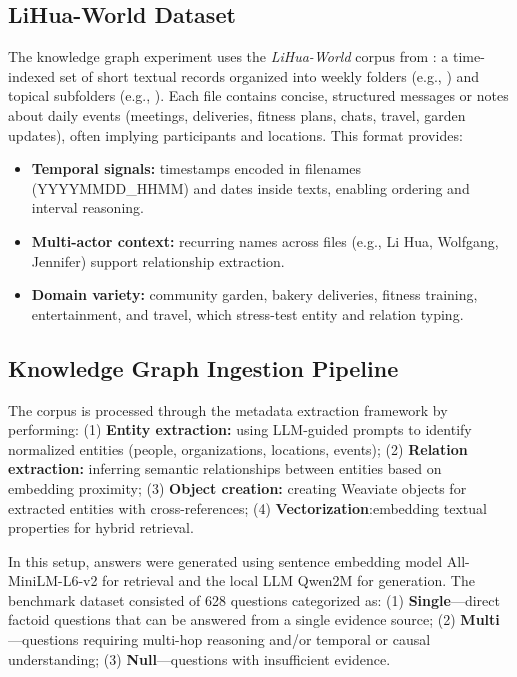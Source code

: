 \subsection{LiHua-World Dataset}
\label{subsec:LiHua-World}
The knowledge graph experiment uses the \emph{LiHua-World} corpus from \cite{fan2025minirag}: a time-indexed set of short textual records organized into weekly folders (e.g., ) and topical subfolders (e.g., ). Each file contains concise, structured messages or notes about daily events (meetings, deliveries, fitness plans, chats, travel, garden updates), often implying participants and locations. This format provides:
\begin{itemize}
    \item \textbf{Temporal signals:} timestamps encoded in filenames (YYYYMMDD\_HHMM) and dates inside texts, enabling ordering and interval reasoning.
    \item \textbf{Multi-actor context:} recurring names across files (e.g., Li Hua, Wolfgang, Jennifer) support relationship extraction.
    \item \textbf{Domain variety:} community garden, bakery deliveries, fitness training, entertainment, and travel, which stress-test entity and relation typing.
\end{itemize}

\subsection{Knowledge Graph Ingestion Pipeline}

The corpus is processed through the metadata extraction framework by performing: (1) \textbf{Entity extraction:} using LLM-guided prompts to identify normalized entities (people, organizations, locations, events); (2) \textbf{Relation extraction:} inferring semantic relationships between entities based on embedding proximity; (3) \textbf{Object creation:} creating  Weaviate objects for extracted entities with cross-references; (4) \textbf{Vectorization}:embedding textual properties for hybrid retrieval.


In this setup, answers were generated using sentence embedding model All-MiniLM-L6-v2 for retrieval and the local LLM Qwen2M for generation. The benchmark dataset consisted of 628 questions categorized as: (1) \textbf{Single}—direct factoid questions that can be answered from a single evidence source; (2) \textbf{Multi}—questions requiring multi-hop reasoning and/or temporal or causal understanding; (3) \textbf{Null}—questions with insufficient evidence.

